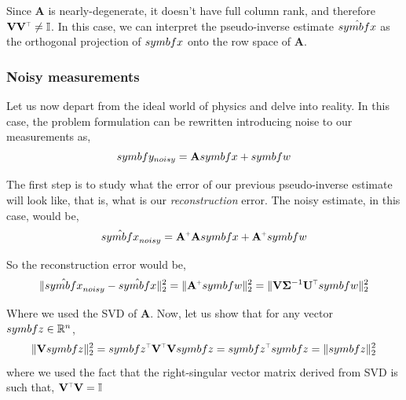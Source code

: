 \documentclass[SE,authoryear,toc]{lsstdoc}
\renewcommand{\v}[1]{\mathbf{#1}}
\newcommand{\plus}{\scalebox{0.6}{$+$}}
\newcommand{\tr}{\scalebox{0.6}{$\top$}}
\DeclarePairedDelimiter{\norm}{\lVert}{\rVert}
\begin{document}
Since $\v{A}$ is nearly-degenerate, it doesn't have full column rank, and therefore $\v{V}\v{V^{\tr}} \neq \mathbb{I}$. In this case, we can interpret the pseudo-inverse estimate $\hat{\\symbf{x}}$ as the orthogonal projection of $\\symbf{x}$ onto the row space of $\v{A}$. 


\subsubsection*{Noisy measurements}
Let us now depart from the ideal world of physics and delve into reality. In this case, the problem formulation can be rewritten introducing noise to our measurements as,
\begin{equation}
    \\symbf{y}_{noisy} = \v{A} \\symbf{x} + \\symbf{w}
\end{equation}

The first step is to study what the error of our previous pseudo-inverse estimate will look like, that is, what is our \textit{reconstruction} error. The noisy estimate, in this case, would be, 
\begin{equation}
    \hat{\\symbf{x}}_{noisy} = \v{A}^{\plus}\v{A}\\symbf{x} +\v{A}^{\plus}\\symbf{w} 
\end{equation}

So the reconstruction error would be, 
\begin{equation}
    \norm{\hat{\\symbf{x}}_{noisy} - \hat{\\symbf{x}}}_2^2 = \norm{\v{A}^{\plus}\\symbf{w} }_2^2 = \norm{\v{V}\v{\Sigma}^{-1}\v{U}^{\tr}\\symbf{w} }_2^2
\end{equation}

Where we used the SVD of $\v{A}$. Now, let us show that for any vector $\\symbf{z} \in \mathbb{R}^n$, 
\begin{equation}
    \norm{\v{V}\\symbf{z}}_2^2 = \\symbf{z}^{\tr}\v{V}^{\tr}\v{V}\\symbf{z} = \\symbf{z}^{\tr}\\symbf{z} =  \norm{\\symbf{z}}_2^2
\end{equation}
where we used the fact that the right-singular vector matrix derived from SVD is such that, $\v{V}^{\tr}\v{V} = \mathbb{I}$
\end{document}
